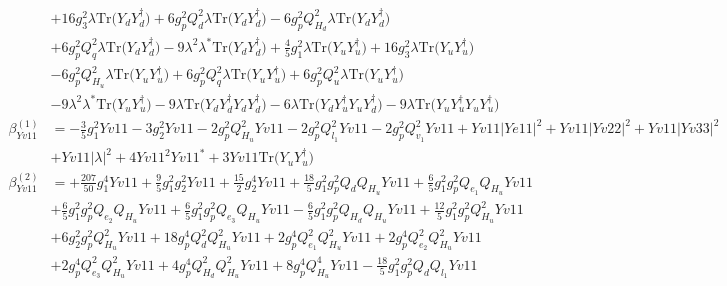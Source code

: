 \begin{align}
 &+16 g_{3}^{2} \lambda \mbox{Tr}\Big({Y_d  Y_{d}^{\dagger}}\Big) +6 g_{p}^{2} Q_{d}^{2} \lambda \mbox{Tr}\Big({Y_d  Y_{d}^{\dagger}}\Big) -6 g_{p}^{2} Q_{H_d}^{2} \lambda \mbox{Tr}\Big({Y_d  Y_{d}^{\dagger}}\Big) \nonumber \\ 
 &+6 g_{p}^{2} Q_{q}^{2} \lambda \mbox{Tr}\Big({Y_d  Y_{d}^{\dagger}}\Big) -9 \lambda^{2} \lambda^* \mbox{Tr}\Big({Y_d  Y_{d}^{\dagger}}\Big) +\frac{4}{5} g_{1}^{2} \lambda \mbox{Tr}\Big({Y_u  Y_{u}^{\dagger}}\Big) +16 g_{3}^{2} \lambda \mbox{Tr}\Big({Y_u  Y_{u}^{\dagger}}\Big) \nonumber \\ 
 &-6 g_{p}^{2} Q_{H_u}^{2} \lambda \mbox{Tr}\Big({Y_u  Y_{u}^{\dagger}}\Big) +6 g_{p}^{2} Q_{q}^{2} \lambda \mbox{Tr}\Big({Y_u  Y_{u}^{\dagger}}\Big) +6 g_{p}^{2} Q_{u}^{2} \lambda \mbox{Tr}\Big({Y_u  Y_{u}^{\dagger}}\Big) \nonumber \\ 
 &-9 \lambda^{2} \lambda^* \mbox{Tr}\Big({Y_u  Y_{u}^{\dagger}}\Big) -9 \lambda \mbox{Tr}\Big({Y_d  Y_{d}^{\dagger}  Y_d  Y_{d}^{\dagger}}\Big) -6 \lambda \mbox{Tr}\Big({Y_d  Y_{u}^{\dagger}  Y_u  Y_{d}^{\dagger}}\Big) -9 \lambda \mbox{Tr}\Big({Y_u  Y_{u}^{\dagger}  Y_u  Y_{u}^{\dagger}}\Big) \\ 
\beta_{Yv11}^{(1)} & =  
-\frac{3}{5} g_{1}^{2} Yv11 -3 g_{2}^{2} Yv11 -2 g_{p}^{2} Q_{H_u}^{2} Yv11 -2 g_{p}^{2} Q_{l_1}^{2} Yv11 -2 g_{p}^{2} Q_{v_1}^{2} Yv11 +Yv11 |Ye11|^2 +Yv11 |Yv22|^2 +Yv11 |Yv33|^2 \nonumber \\ 
 &+Yv11 |\lambda|^2 +4 Yv11^{2} Yv11^* +3 Yv11 \mbox{Tr}\Big({Y_u  Y_{u}^{\dagger}}\Big) \\ 
\beta_{Yv11}^{(2)} & =  
+\frac{207}{50} g_{1}^{4} Yv11 +\frac{9}{5} g_{1}^{2} g_{2}^{2} Yv11 +\frac{15}{2} g_{2}^{4} Yv11 +\frac{18}{5} g_{1}^{2} g_{p}^{2} Q_{d} Q_{H_u} Yv11 +\frac{6}{5} g_{1}^{2} g_{p}^{2} Q_{e_{1}} Q_{H_u} Yv11 \nonumber \\ 
 &+\frac{6}{5} g_{1}^{2} g_{p}^{2} Q_{e_{2}} Q_{H_u} Yv11 +\frac{6}{5} g_{1}^{2} g_{p}^{2} Q_{e_3} Q_{H_u} Yv11 -\frac{6}{5} g_{1}^{2} g_{p}^{2} Q_{H_d} Q_{H_u} Yv11 +\frac{12}{5} g_{1}^{2} g_{p}^{2} Q_{H_u}^{2} Yv11 \nonumber \\ 
 &+6 g_{2}^{2} g_{p}^{2} Q_{H_u}^{2} Yv11 +18 g_{p}^{4} Q_{d}^{2} Q_{H_u}^{2} Yv11 +2 g_{p}^{4} Q_{e_{1}}^{2} Q_{H_u}^{2} Yv11 +2 g_{p}^{4} Q_{e_{2}}^{2} Q_{H_u}^{2} Yv11 \nonumber \\ 
 &+2 g_{p}^{4} Q_{e_3}^{2} Q_{H_u}^{2} Yv11 +4 g_{p}^{4} Q_{H_d}^{2} Q_{H_u}^{2} Yv11 +8 g_{p}^{4} Q_{H_u}^{4} Yv11 -\frac{18}{5} g_{1}^{2} g_{p}^{2} Q_{d} Q_{l_1} Yv11 \nonumber \\ 

\end{align}
